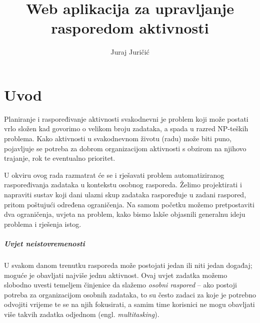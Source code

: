 \documentclass[times, utf8, zavrsni]{fer}
\begin{document}
\nocite{*}


\title{Web aplikacija za upravljanje rasporedom aktivnosti}

\author{Juraj Juričić}

\maketitle


\zahvala{}

\tableofcontents

\chapter{Uvod}\label{uvod}
Planiranje i raspoređivanje aktivnosti svakodnevni je problem koji može postati vrlo složen kad govorimo o velikom broju zadataka, a spada u razred NP-teških problema. Kako aktivnosti u svakodnevnom životu (radu) može biti puno, pojavljuje se potreba za dobrom organizacijom aktivnosti s obzirom na njihovo trajanje, rok te eventualno prioritet.

U okviru ovog rada razmatrat će se i rješavati problem automatiziranog raspoređivanja zadataka u kontekstu osobnog rasporeda. Želimo projektirati i napraviti sustav koji dani ulazni skup zadataka raspoređuje u zadani raspored, pritom poštujući određena ograničenja. Na samom početku možemo pretpostaviti dva ograničenja, uvjeta na problem, kako bismo lakše objasnili generalnu ideju problema i rješenja istog.

\paragraph{Uvjet neistovremenosti} U svakom danom trenutku rasporeda može postojati jedan ili niti jedan događaj; moguće je obavljati najviše jednu aktivnost. Ovaj uvjet zadatka možemo slobodno uvesti temeljem činjenice da slažemo \textit{osobni raspored} -- ako postoji potreba za organizacijom osobnih zadataka, to su često zadaci za koje je potrebno odvojiti vrijeme te se na njih fokusirati, a samim time korisnici ne mogu obavljati više takvih zadatka odjednom (engl. \textit{multitasking}).
\end{document}
